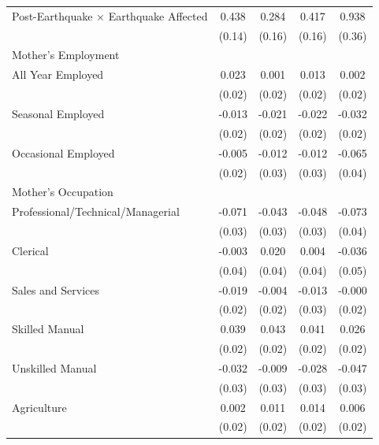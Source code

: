 \begin{longtable}{l*{4}{c}}
Post-Earthquake × Earthquake Affected & 0.438\sym{***} & 0.284\sym{*} & 0.417\sym{**} & 0.938\sym{**} \\
                    & (0.14) & (0.16) & (0.16) & (0.36) \\
\multicolumn{5}{l}{Mother's Employment} \\
\hspace{1em}All Year Employed & 0.023 & 0.001 & 0.013 & 0.002 \\
                    & (0.02) & (0.02) & (0.02) & (0.02) \\
\hspace{1em}Seasonal Employed & -0.013 & -0.021 & -0.022 & -0.032 \\
                    & (0.02) & (0.02) & (0.02) & (0.02) \\
\hspace{1em}Occasional Employed & -0.005 & -0.012 & -0.012 & -0.065\sym{*} \\
                    & (0.02) & (0.03) & (0.03) & (0.04) \\
\multicolumn{5}{l}{Mother's Occupation} \\
\hspace{1em}Professional/Technical/Managerial & -0.071\sym{**} & -0.043 & -0.048 & -0.073\sym{*} \\
                    & (0.03) & (0.03) & (0.03) & (0.04) \\
\hspace{1em}Clerical & -0.003 & 0.020 & 0.004 & -0.036 \\
                    & (0.04) & (0.04) & (0.04) & (0.05) \\
\hspace{1em}Sales and Services & -0.019 & -0.004 & -0.013 & -0.000 \\
                    & (0.02) & (0.02) & (0.03) & (0.02) \\
\hspace{1em}Skilled Manual & 0.039\sym{**} & 0.043\sym{*} & 0.041\sym{**} & 0.026 \\
                    & (0.02) & (0.02) & (0.02) & (0.02) \\
\hspace{1em}Unskilled Manual & -0.032 & -0.009 & -0.028 & -0.047 \\
                    & (0.03) & (0.03) & (0.03) & (0.03) \\
\hspace{1em}Agriculture & 0.002 & 0.011 & 0.014 & 0.006 \\
                    & (0.02) & (0.02) & (0.02) & (0.02) \\

\end{longtable}
